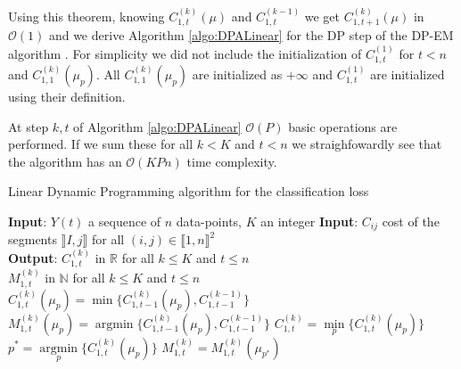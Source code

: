 \documentclass{llncs}
\begin{document}
Using this theorem, knowing $C_{1, t}^{(k)}(\mu)$ and $C_{1, t}^{(k-1)}$ we get $C_{1, t+1}^{(k)}(\mu)$ in $\mathcal{O}(1)$
and we derive Algorithm \ref{algo:DPALinear} for the DP step of the DP-EM algorithm \cite{picard_2007}. For simplicity we did not include the initialization of $C^{(1)}_{1,t}$ for $t < n$ and $C^{(k)}_{1,1}(\mu_p)$.
All $C^{(k)}_{1,1}(\mu_p)$ are initialized as $+\infty$ and $C^{(1)}_{1,t}$ are initialized using their definition.

At step $k, t$ of Algorithm \ref{algo:DPALinear}  $\mathcal{O}(P)$ basic operations are performed. If we sum these for all $k < K$ and $t < n$  we straighfowardly see that the algorithm has an $\mathcal{O}(KPn)$ time complexity.
\begin{algorithm}
\begin{algorithmic}
\caption{Linear Dynamic Programming algorithm for the classification loss}\label{algo:DPALinear}
    \State \textbf{Input}: $Y(t)$ a sequence of $n$ data-points, $K$ an integer 
 \State \textbf{Input}: $C_{ij}$ cost of the segments $\rrbracket I, j \rrbracket$  for all $(i, j) \in \llbracket1, n \rrbracket^2$\\
   \State \textbf{Output}: $C^{(k)}_{1,t}$ in $\mathbb{R}$ for all $k \leq K$ and $t \leq n$ \\
    \State $M^{(k)}_{1,t}$ in $\mathbb{N}$ for all $k \leq K$ and $t \leq n$ \\

           \State $C^{(k)}_{1,t}(\mu_p) = \min \{ C^{(k)}_{1,t-1}(\mu_p), C^{(k-1)}_{1,t-1} \}$ 
            \State      $M^{(k)}_{1,t}(\mu_p) = \operatorname{argmin} \{C^{(k)}_{1,t-1}(\mu_p), C^{(k-1)}_{1,t-1} \}$ 
          \EndFor        
           \State $C^{(k)}_{1,t} = \underset{p}{\min} \{ C^{(k)}_{1,t}(\mu_p) \}$ 
	   \State $p^* = \underset{p}{\operatorname{argmin}} \{ C^{(k)}_{1,t}(\mu_p) \}$ 
           \State $M^{(k)}_{1,t} = M^{(k)}_{1,t}( \mu_{{p^*}}) $ 
         \EndFor
    \EndFor
  \end{algorithmic}
\end{algorithm}
\end{document}
